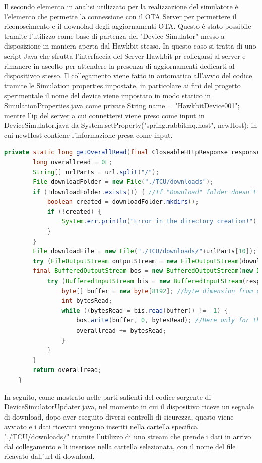Il secondo elemento in analisi utilizzato per la realizzazione del simulatore è l'elemento che permette la connessione con il OTA Server per permettere il riconoscimento e il downolad degli aggiornamenti OTA. Questo è stato possibile tramite l'utilizzo come base di partenza del "Device Simulator" messo a disposizione in maniera aperta dal Hawkbit stesso. In questo caso si tratta di uno script Java che sfrutta l'interfaccia del Server Hawkbit pr collegarsi al server e rimanere in ascolto per attendere la presenza di aggiornamenti dedicarti al dispositivco stesso.
Il collegamento viene fatto in automatico all'avvio del codice tramite le Simulation properties impostate, in particolare ai fini del progetto sperimentale il nome del device viene impostato in modo statico in SimulationProperties.java come private String name = "HawkbitDevice001"; mentre l'ip del server a cui connettersi viene preso come input in DeviceSimulator.java da System.setProperty("spring.rabbitmq.host", newHost); in cui newHost contiene l'informazione presa come input.
\begin{lstlisting}[language=Java, caption={Hawbit Device simulator source code}, label=lst:HawkbitDeviceSimulator]
    private static long getOverallRead(final CloseableHttpResponse response, final MessageDigest md, final String url) throws IOException {
        long overallread = 0L;
        String[] urlParts = url.split("/");
        File downloadFolder = new File("./TCU/downloads");
        if (!downloadFolder.exists()) { //If "Download" folder doesn't exist
            boolean created = downloadFolder.mkdirs();
            if (!created) {
                System.err.println("Error in the directory creation!");
            }
        }
        File downloadFile = new File("./TCU/downloads/"+urlParts[10]);
        try (FileOutputStream outputStream = new FileOutputStream(downloadFile);
        final BufferedOutputStream bos = new BufferedOutputStream(new DigestOutputStream(outputStream, md))) {
            try (BufferedInputStream bis = new BufferedInputStream(response.getEntity().getContent())) {
                byte[] buffer = new byte[8192]; //byte dimension from createBuffer of ByteStream.class
                int bytesRead;
                while ((bytesRead = bis.read(buffer)) != -1) {
                    bos.write(buffer, 0, bytesRead); //Here only for the md hash correctness.
                    overallread += bytesRead;
                }
            }
        }
        return overallread;
    }
\end{lstlisting}
In seguito, come mostrato nelle parti salienti del codice sorgente di DeviceSimulatorUpdater.java, nel momento in cui il dispositivo riceve un segnale di download, dopo aver eseguito diversi controlli di sicurezza, questo viene avviato e i dati ricevuti vengono inseriti nella cartella specifica "./TCU/downloads/" tramite l'utilizzo di uno stream che prende i dati in arrivo dal collegamento e li inserisce nella cartella selezionata, con il nome del file ricavato dall'url di download. 

